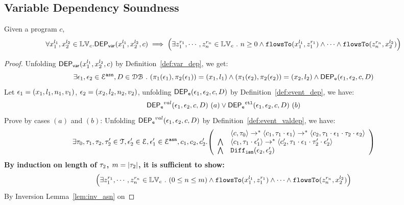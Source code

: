 
\clearpage
\subsection{Variable Dependency Soundness}
\begin{thm}
Given a program ${c}$, 
\[
  \forall {x}_1^{l_1}, {x}_2^{l_2} \in \mathbb{LV}_{{c}}.
  \mathsf{DEP_{var}}({x}_1^{l_1}, {x}_2^{l_2}, {c})
  \implies 
  \Big( \exists z_1^{r_1}, \cdots, z_n^{r_n} \in \mathbb{LV}_{{c}} ~.~ n \geq 0 \land
  \mathtt{flowsTo}(x_1^{l_1}, z_1^{r_1}) 
  \land \cdots \land \mathtt{flowsTo}(z_n^{r_n}, {x}_2^{l_2}) \Big)
\]
\end{thm}
\begin{proof}
Unfolding $\mathsf{DEP_{var}}({x}_1^{l_1}, {x}_2^{l_2}, {c})$ by Definition~\ref{def:var_dep},
we get:
\[
\exists \mathtt{\epsilon}_1, \mathtt{\epsilon}_2 \in \mathcal{E}^{\mathtt{{asn}}}, D \in \mathcal{DB} ~.~
(\pi_1{(\mathtt{\epsilon}_1)}, \pi_2(\mathtt{\epsilon}_1))= ({x}_1, l_1)
\land
(\pi_1{(\mathtt{\epsilon}_2)}, \pi_2(\mathtt{\epsilon}_2)) = ({x}_2, l_2)
\land 
\mathsf{DEP_{\mathtt{e}}}(\mathtt{\epsilon}_1, \mathtt{\epsilon}_2, c, D)
\]
%
Let $\mathtt{\epsilon}_1 = (x_1, l_1, n_1, v_1)$, $\mathtt{\epsilon}_2 = (x_2, l_2, n_2, v_2)$, unfolding $\mathsf{DEP_{\mathtt{e}}}(\mathtt{\epsilon}_1, \mathtt{\epsilon}_2, c, D)$ by Definition~\ref{def:event_dep}, we have:
\[
\mathsf{DEP_{\mathtt{e}}}^{val}(\mathtt{\epsilon}_1, \mathtt{\epsilon}_2, c, D) ~ (a) 
\lor
\mathsf{DEP_{\mathtt{e}}}^{\mathtt{{ctl}}}(\mathtt{\epsilon}_1, \mathtt{\epsilon}_2, c, D) ~ (b)
\]
Prove by cases $(a)$ and $(b)$:
%
%
Unfolding $\mathsf{DEP_{\mathtt{e}}}^{val}(\mathtt{\epsilon}_1, \mathtt{\epsilon}_2, c, D)$ by Definition~\ref{def:event_valdep}, we have:
\[
\exists \vtrace_0,
\vtrace_1, \vtrace_2, \vtrace_2' \in \mathcal{T}, \event_2' \in \eventset, \event_1' \in \eventset^{\asn}, {c}_1, {c}_2,  {c}_2'.
  \left(
  \begin{array}{ll}   
 & \config{{c}, \vtrace_0} \rightarrow^{*} 
\config{{c}_1, \vtrace_1 \cdot \event_1}  \rightarrow^{*} 
  \config{{c}_2,  \vtrace_1 \cdot \event_1 \cdot \vtrace_2 \cdot \event_2 } 
 \\ 
 \bigwedge &
  \config{{c}_1, \vtrace_1 \cdot \event_1'}  \rightarrow^{*} 
  \config{{c}_2',  \vtrace_1 \cdot \event_1  \cdot \vtrace_2' \cdot \event_2' } 
\\
\bigwedge & \ismdiff(\event_2,\event_2')
\end{array}
\right)
 \]
 \textbf{By induction on length of $\mathtt{\tau}_2$, $m = |\mathtt{\tau}_2|$, it is sufficient to show:}
%
 \[
 \Big(\exists z_1^{r_1}, \cdots, z_n^{r_n} \in \mathbb{LV}_{{c}} ~.~ (0 \leq n \leq m )
 \land \mathtt{flowsTo}(x_1^{l_1}, z_1^{r_1}) \land \cdots \land \mathtt{flowsTo}(z_n^{r_n}, {x}_2^{l_2}) \Big)
  \]
%
By Inversion Lemma~\ref{lem:inv_asn} on 

\end{proof}
